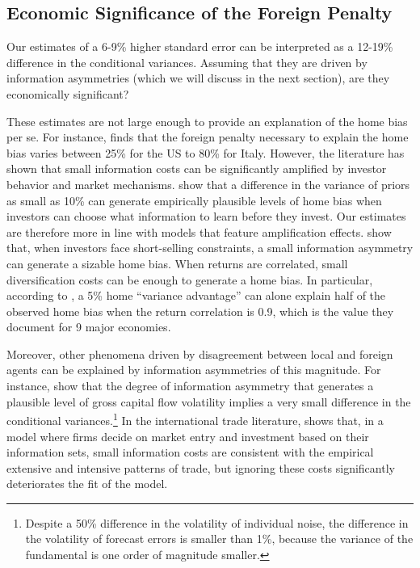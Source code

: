 \subsection{Economic Significance of the Foreign Penalty}

Our estimates of a 6-9\% higher standard error can be interpreted as a 12-19\% difference in the conditional variances. Assuming that they are driven by information asymmetries (which we will discuss in the next section), are they economically significant? 

These estimates are not large enough to provide an explanation of the home bias per se. For instance, \citet{Jeske2001} finds that the foreign penalty necessary to explain the home bias varies between 25\% for the US to 80\% for Italy. However, the literature has shown that small information costs can be significantly amplified by investor behavior and market mechanisms. \citet{VanNieuwerburghVeldkamp2009} show that a difference in the variance of priors as small as 10\% can generate empirically plausible levels of home bias when investors can choose what information to learn before they invest. Our estimates are therefore more in line with models that feature amplification effects. \citet{Hatchondo2008} show that, when investors face short-selling constraints, a small information asymmetry can generate a sizable home bias. When returns are correlated, small diversification costs can be enough to generate a home bias. In particular, according to \citet{Wallmeier2022}, a 5\% home ``variance advantage'' can alone explain half of the observed home bias when the return correlation is 0.9, which is the value they document for 9 major economies.

Moreover, other phenomena driven by disagreement between local and foreign agents can be explained by information asymmetries of this magnitude. For instance, \citet{TillevanWincoop2014} show that the degree of information asymmetry that generates a plausible level of gross capital flow volatility implies a very small difference in the conditional variances.\footnote{Despite a 50\% difference in the volatility of individual noise, the difference in the volatility of forecast errors is smaller than 1\%, because the variance of the fundamental is one order of magnitude smaller.} In the international trade literature, \citet{Allen2014} shows that, in a model where firms decide on market entry and investment based on their information sets, small information costs are consistent with the empirical extensive and intensive patterns of trade, but ignoring these costs significantly deteriorates the fit of the model.

